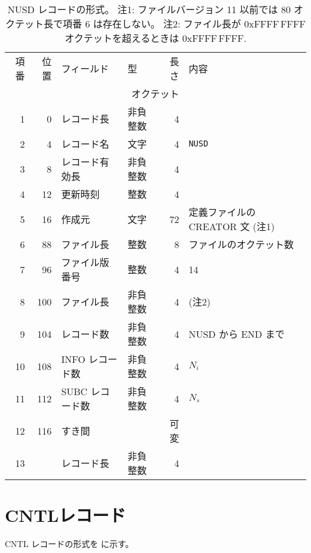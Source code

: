\begin{table}[htp]
 \begin{center}
 \begin{tabular}{rr|llrl}
 \hline
 項番 & 位置 & フィールド & 型 & 長さ & 内容 \\
      &      &            & \multicolumn{2}{r}{オクテット} &  \\
 \hline
 1 & 0 & レコード長 & 非負整数 & 4 & \\
 2 & 4 & レコード名 & 文字 & 4 & {\tt NUSD} \\
 3 & 8 & レコード有効長 & 非負整数 & 4 & \\
 4 & 12 & 更新時刻 & 整数 & 4 & \\
 \hline
 5 & 16 & 作成元 & 文字 & 72 & 定義ファイルの CREATOR 文 (注1) \\
 6 & 88 & ファイル長 & 整数 & 8 & ファイルのオクテット数 \\
 7 & 96 & ファイル版番号 & 整数 & 4 & 14 \\
 8 & 100 & ファイル長 & 非負整数 & 4 & (注2) \\
 9 & 104 & レコード数 & 非負整数 & 4 & NUSD から END まで \\
 10 & 108 & INFO レコード数 & 非負整数 & 4 & $N_i$ \\
 11 & 112 & SUBC レコード数 & 非負整数 & 4 & $N_s$ \\
 \hline
 12 & 116 & すき間 & & 可変 &  \\
 13 &  & レコード長 & 非負整数 & 4 &  \\
 \hline
 \end{tabular}
 \end{center}
 \caption[NUSD レコードの形式]{%
  NUSD レコードの形式。
  注1: ファイルバージョン 11 以前では 80 オクテット長で項番 6 は存在しない。
  注2: ファイル長が 0xFFFF\,FFFF オクテットを超えるときは 0xFFFF\,FFFF.
 }
 \label{table.fmt.nusd}
\end{table}

\newpage
\section{CNTLレコード}
\label{sec:fmt.cntl}

CNTL レコードの形式を  に示す。

